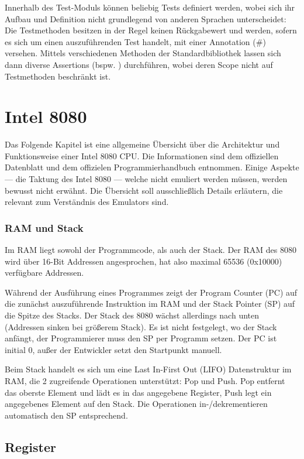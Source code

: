 Innerhalb des Test-Moduls können beliebig Tests definiert werden, wobei sich ihr Aufbau und Definition nicht grundlegend von anderen Sprachen unterscheidet: Die Testmethoden besitzen in der Regel keinen Rückgabewert und werden, sofern es sich um einen auszuführenden Test handelt, mit einer Annotation (\#\rust{[test]}) versehen. Mittels verschiedenen Methoden der Standardbibliothek lassen sich dann diverse Assertions (bspw. ) durchführen, wobei deren Scope nicht auf Testmethoden beschränkt ist.

\section{Intel 8080}

Das Folgende Kapitel ist eine allgemeine Übersicht über die Architektur und Funktionsweise einer Intel 8080 CPU. Die Informationen sind dem offiziellen Datenblatt\cite{datasheet} und dem offizielen Programmierhandbuch\cite{progManual} entnommen.
Einige Aspekte --- \zB die Taktung des Intel 8080 --- welche nicht emuliert werden müssen, werden bewusst nicht erwähnt. Die Übersicht soll ausschließlich Details erläutern, die relevant zum Verständnis des Emulators sind.

\subsubsection{RAM und Stack}

Im \ac{RAM} liegt sowohl der Programmcode, als auch der Stack.
Der \ac{RAM} des 8080 wird über 16-Bit Addressen angesprochen, hat also maximal 65536 (0x10000) verfügbare Addressen.

Während der Ausführung eines Programmes zeigt der Program Counter (PC) auf die zunächst auszuführende Instruktion im \ac{RAM} und der Stack Pointer (SP) auf die Spitze des Stacks. Der Stack des 8080 wächst allerdings nach unten (Addressen sinken bei größerem Stack).
Es ist nicht festgelegt, wo der Stack anfängt, der Programmierer muss den SP per Programm setzen. Der PC ist initial 0, außer der Entwickler setzt den Startpunkt manuell.

Beim Stack handelt es sich um eine Last In-First Out (LIFO) Datenstruktur im \ac{RAM}, die 2 zugreifende Operationen unterstützt: Pop und Push. Pop entfernt das oberste Element und lädt es in das angegebene Register, Push legt ein angegebenes Element auf den Stack. Die Operationen in-/dekrementieren automatisch den SP entsprechend.

\subsection{Register}

